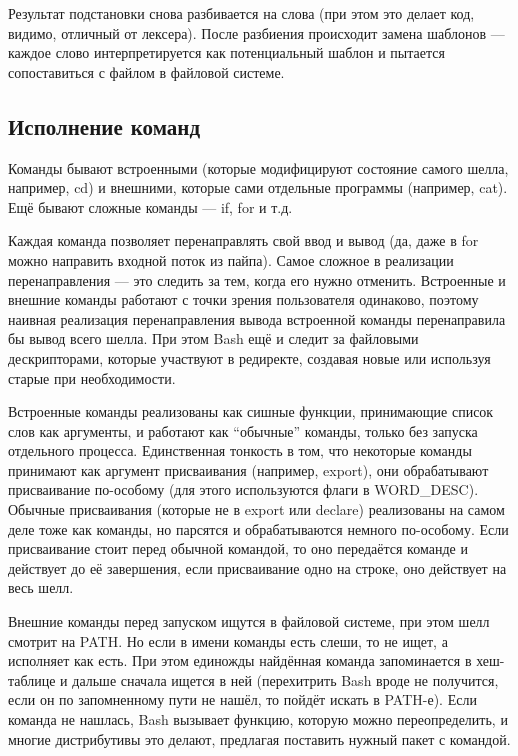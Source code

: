 \documentclass[a5paper]{article}
\begin{document}
Результат подстановки снова разбивается на слова (при этом это делает код, видимо, отличный от лексера). После разбиения происходит замена шаблонов --- каждое слово интерпретируется как потенциальный шаблон и пытается сопоставиться с файлом в файловой системе.

\subsection{Исполнение команд}

Команды бывают встроенными (которые модифицируют состояние самого шелла, например, cd) и внешними, которые сами отдельные программы (например, cat). Ещё бывают сложные команды --- if, for и т.д.

Каждая команда позволяет перенаправлять свой ввод и вывод (да, даже в for можно направить входной поток из пайпа). Самое сложное в реализации перенаправления --- это следить за тем, когда его нужно отменить. Встроенные и внешние команды работают с точки зрения пользователя одинаково, поэтому наивная реализация перенаправления вывода встроенной команды перенаправила бы вывод всего шелла. При этом Bash ещё и следит за файловыми дескрипторами, которые участвуют в редиректе, создавая новые или используя старые при необходимости.

Встроенные команды реализованы как сишные функции, принимающие список слов как аргументы, и работают как ``обычные'' команды, только без запуска отдельного процесса. Единственная тонкость в том, что некоторые команды принимают как аргумент присваивания (например, export), они обрабатывают присваивание по-особому (для этого используются флаги в WORD\_DESC). Обычные присваивания (которые не в export или declare) реализованы на самом деле тоже как команды, но парсятся и обрабатываются немного по-особому. Если присваивание стоит перед обычной командой, то оно передаётся команде и действует до её завершения, если присваивание одно на строке, оно действует на весь шелл. 

Внешние команды перед запуском ищутся в файловой системе, при этом шелл смотрит на PATH. Но если в имени команды есть слеши, то не  ищет, а исполняет как есть. При этом единожды найдённая команда запоминается в хеш-таблице и дальше сначала ищется в ней (перехитрить Bash вроде не получится, если он по запомненному пути не нашёл, то пойдёт искать в PATH-е). Если команда не нашлась, Bash вызывает функцию, которую можно переопределить, и многие дистрибутивы это делают, предлагая поставить нужный пакет с командой.
\end{document}
